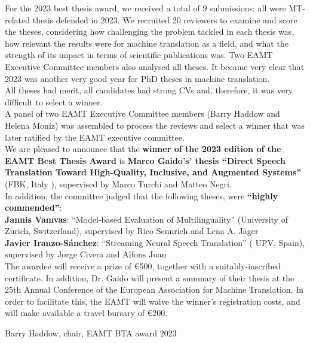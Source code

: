 For the 2023 best thesis award, we received a total of 9 submissions; all were MT-related thesis defended in 2023.  We recruited 20 reviewers to examine and score the theses, considering how challenging the problem tackled in each thesis was, how relevant the results were for machine translation as a field, and what the strength of its impact in terms of scientific publications was. Two EAMT Executive Committee members also analysed all theses. It became very clear that 2023 was another very good year for PhD theses in machine translation. 
\\

All theses had merit, all candidates had strong CVs and, therefore, it was very difficult to select a winner.
\\

A panel of two EAMT Executive Committee members (Barry Haddow and Helena Moniz) was assembled to process the reviews and select a winner that was later ratified by the EAMT executive committee.
\\

We are pleased to announce that the {\bf winner of the 2023 edition of the EAMT Best Thesis Award} is {\bf Marco Gaido's' thesis ``Direct Speech Translation Toward High-Quality, Inclusive, and Augmented Systems''} (FBK, Italy ), supervised by Marco Turchi and Matteo Negri.
\\

In addition, the committee judged  that the following theses, were {\bf ``highly commended''}:
\\
{\bf Jannis Vamvas}: “Model-based Evaluation of Multilinguality” (University of Zurich, Switzerland), supervised by Rico Sennrich and Lena A. Jäger
\\

{\bf Javier Iranzo-Sánchez}: ``Streaming Neural Speech Translation'' ( UPV, Spain), supervised by Jorge Civera and Alfons Juan 
\\

The awardee will receive a prize of €500, together with a suitably-inscribed certificate. In addition, Dr. Gaido will present a summary of their thesis at the 25th Annual Conference of the European Association for Machine Translation.  In order to facilitate this, the EAMT will waive the winner's registration costs, and will make available a travel bursary of €200.


\bigbreak

Barry Haddow, chair, EAMT BTA award 2023
